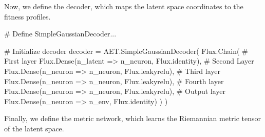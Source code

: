 \documentclass[
]{scrartcl}
\newenvironment{Shaded}{\begin{snugshade}}{\end{snugshade}}
\newcommand{\CommentTok}[1]{\textcolor[rgb]{0.37,0.37,0.37}{#1}}
\newcommand{\FunctionTok}[1]{\textcolor[rgb]{0.28,0.35,0.67}{#1}}
\newcommand{\NormalTok}[1]{\textcolor[rgb]{0.00,0.23,0.31}{#1}}
\newcommand{\OperatorTok}[1]{\textcolor[rgb]{0.37,0.37,0.37}{#1}}
\begin{document}
Now, we define the decoder, which maps the latent space coordinates to
the fitness profiles.

\begin{Shaded}
\begin{Highlighting}[]
\CommentTok{\# Define SimpleGaussianDecoder...}

\CommentTok{\# Initialize decoder}
\NormalTok{decoder }\OperatorTok{=}\NormalTok{ AET.}\FunctionTok{SimpleGaussianDecoder}\NormalTok{(}
\NormalTok{    Flux.}\FunctionTok{Chain}\NormalTok{(}
        \CommentTok{\# First layer}
\NormalTok{        Flux.}\FunctionTok{Dense}\NormalTok{(n\_latent }\OperatorTok{=\textgreater{}}\NormalTok{ n\_neuron, Flux.identity),}
        \CommentTok{\# Second Layer}
\NormalTok{        Flux.}\FunctionTok{Dense}\NormalTok{(n\_neuron }\OperatorTok{=\textgreater{}}\NormalTok{ n\_neuron, Flux.leakyrelu),}
        \CommentTok{\# Third layer}
\NormalTok{        Flux.}\FunctionTok{Dense}\NormalTok{(n\_neuron }\OperatorTok{=\textgreater{}}\NormalTok{ n\_neuron, Flux.leakyrelu),}
        \CommentTok{\# Fourth layer}
\NormalTok{        Flux.}\FunctionTok{Dense}\NormalTok{(n\_neuron }\OperatorTok{=\textgreater{}}\NormalTok{ n\_neuron, Flux.leakyrelu),}
        \CommentTok{\# Output layer}
\NormalTok{        Flux.}\FunctionTok{Dense}\NormalTok{(n\_neuron }\OperatorTok{=\textgreater{}}\NormalTok{ n\_env, Flux.identity)}
\NormalTok{    )}
\NormalTok{)}
\end{Highlighting}
\end{Shaded}

Finally, we define the metric network, which learns the Riemannian
metric tensor of the latent space.
\end{document}
